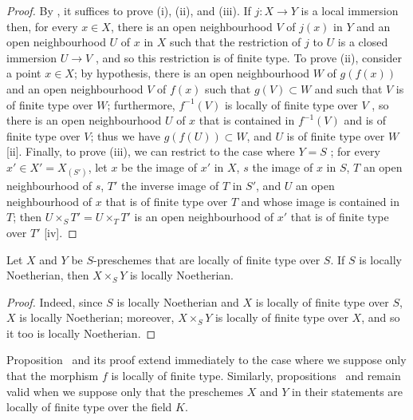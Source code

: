 \begin{proof}
By , it suffices to prove (i), (ii), and (iii).
If $j:X\to Y$ is a local immersion then, for every $x\in X$, there is an open neighbourhood $V$ of $j(x)$ in $Y$ and an open neighbourhood $U$ of $x$ in $X$ such that the restriction of $j$ to $U$ is a closed immersion $U\to V$ , and so this restriction is of finite type.
To prove (ii), consider a point $x\in X$;
by hypothesis, there is an open neighbourhood $W$ of $g(f(x))$ and an open neighbourhood $V$ of $f(x)$ such that $g(V)\subset W$ and such that $V$ is of finite type over $W$;
furthermore, $f^{-1}(V)$ is locally of finite type over $V$ , so there is an open neighbourhood $U$ of $x$ that
is contained in $f^{-1}(V)$ and is of finite type over $V$;
thus we have $g(f(U))\subset W$, and $U$ is of finite type over $W$ [ii].
Finally, to prove (iii), we can restrict to the case where $Y=S$ ;
for every $x'\in X'=X_{(S')}$, let $x$ be the image of $x'$ in $X$, $s$ the image of $x$ in $S$, $T$ an open neighbourhood of $s$, $T'$ the inverse image of $T$ in $S'$, and $U$ an open neighbourhood of $x$ that is of finite type over $T$ and whose image is contained in $T$;
then $U\times_S T'=U\times_T T'$ is an open neighbourhood of $x'$  that is of finite type over $T'$ [iv].
\end{proof}

\begin{corollary}[6.6.7]
\label{I.6.6.7}
Let $X$ and $Y$ be $S$-preschemes that are locally of finite type over $S$.
If $S$ is locally Noetherian, then $X\times_S Y$ is locally Noetherian.
\end{corollary}

\begin{proof}
Indeed, since $S$ is locally Noetherian and $X$ is locally of finite type over $S$, $X$ is locally Noetherian; moreover, $X\times_S Y$ is locally of finite type over $X$, and so it too is locally Noetherian.
\end{proof}

\begin{remark}[6.6.8]
\label{I.6.6.8}
Proposition~ and its proof extend immediately to the case where we suppose only that the morphism $f$ is locally of finite type.
Similarly, propositions~ and  remain valid when we suppose only that the preschemes $X$ and $Y$ in their statements are locally of finite type over the field $K$.
\end{remark}
